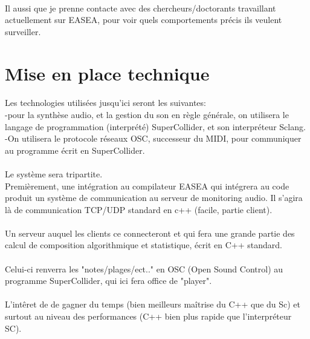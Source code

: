 \documentclass{article}
\begin{document}
    \paragraph{} %
    \label{par:}
      Il aussi que je prenne contacte avec des chercheurs/doctorants travaillant actuellement
      sur EASEA, pour voir quels comportements précis ils veulent surveiller.

  \section{Mise en place technique} %
  \label{sec:Mise en place technique}
    \paragraph{} %
    \label{par:}
      Les technologies utilisées jusqu'ici seront les suivantes:\\
      -pour la synthèse audio, et la gestion du son en règle générale, on utilisera
      le langage de programmation (interprété) SuperCollider, et son interpréteur
      Sclang.\\
      -On utilisera le protocole réseaux OSC, successeur du MIDI, pour communiquer
      au programme écrit en SuperCollider.\\
      \\
      Le système sera tripartite.\\
      Premièrement, une intégration au compilateur EASEA qui intégrera
      au code produit un système de communication au serveur de monitoring audio. Il
      s'agira là de communication TCP/UDP standard en c++ (facile, partie client).\\
      \\
      Un serveur auquel les clients ce connecteront et qui fera une grande partie des
      calcul de composition algorithmique et statistique, écrit en C++
      standard.\\
      \\
      Celui-ci renverra les "notes/plages/ect.." en OSC (Open Sound
      Control) au programme SuperCollider, qui ici fera office de
      "player".\\
      \\
      L'intêret de de gagner du temps (bien meilleurs maîtrise du C++ que du Sc) et
      surtout au niveau des performances (C++ bien plus rapide que l'interpréteur
      SC).
\end{document}
